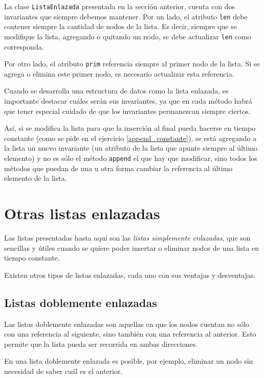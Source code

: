 La clase \lstinline!ListaEnlazada! presentada en la sección anterior,
cuenta con dos invariantes que siempre debemos mantener.  Por un lado, el
atributo \lstinline!len! debe contener siempre la cantidad de nodos de la
lista.  Es decir, siempre que se modifique la lista, agregando o quitando
un nodo, se debe actualizar \lstinline!len! como corresponda.

Por otro lado, el atributo \lstinline!prim! referencia siempre al primer
nodo de la lista. Si se agrega o elimina este primer nodo, es necesario
actualizar esta referencia.

Cuando se desarrolla una estructura de datos como la lista enlazada, es
importante destacar cuáles serán sus invariantes, ya que en cada método
habrá que tener especial cuidado de que los invariantes permanezcan siempre
ciertos.

Así, si se modifica la lista para que la inserción al final pueda hacerse en
tiempo constante (como se pide en el ejercicio \ref{append_constante}),
se está agregando a la lista un nuevo invariante (un atributo de la lista
que apunte siempre al último elemento) y no es sólo el método
\lstinline!append! el que hay que modificar, sino todos los métodos que
puedan de una u otra forma cambiar la referencia al último elemento de la
lista.

\section{Otras listas enlazadas}

Las listas presentadas hasta aquí son las {\it listas simplemente
enlazadas}, que son sencillas y útiles cuando se quiere poder insertar o
eliminar nodos de una lista en tiempo constante.

Existen otros tipos de listas enlazadas, cada uno con sus ventajas y
desventajas.

\subsection*{Listas doblemente enlazadas}

Las listas doblemente enlazadas son aquellas en que los nodos cuentan no
sólo con una referencia al siguiente, sino también con una referencia al
anterior.  Esto permite que la lista pueda ser recorrida en ambas
direcciones.

En una lista doblemente enlazada es posible, por ejemplo, eliminar un
nodo sin necesidad de saber cuál es el anterior.

